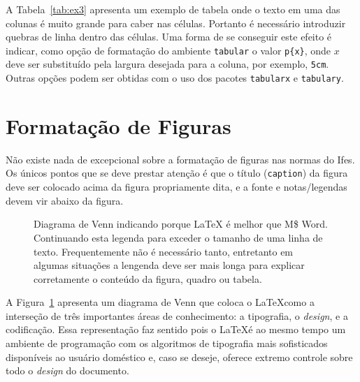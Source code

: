\documentclass[times,english,brazil,oneside,section=TITLE]{ifes8}
\begin{document}
A Tabela~\ref{tab:ex3} apresenta um exemplo de tabela onde o texto em
uma das colunas é muito grande para caber nas células. Portanto é
necessário introduzir quebras de linha dentro das células. Uma forma
de se conseguir este efeito é indicar, como opção de formatação do
ambiente \texttt{tabular} o valor \verb!p{x}!, onde $x$ deve ser
substituído pela largura desejada para a coluna, por exemplo,
\texttt{5cm}. Outras opções podem ser obtidas com o uso dos pacotes
\texttt{tabularx} e \texttt{tabulary}.



\section{Formatação de Figuras}
\label{sec:format-figuras}

Não existe nada de excepcional sobre a formatação de figuras nas
normas do Ifes. Os únicos pontos que se deve prestar atenção é que o
título (\texttt{caption}) da figura deve ser colocado acima da figura
propriamente dita, e a fonte e notas/legendas devem vir abaixo da
figura.

\begin{figure}[h]
  \centering
  \caption{Diagrama de Venn indicando porque \LaTeX{} é melhor que M\$ Word.
    Continuando esta legenda para exceder o tamanho de uma linha de texto.
    Frequentemente não é necessário tanto, entretanto em algumas situações a
    lengenda deve ser mais longa para explicar corretamente o conteúdo da
    figura, quadro ou tabela.}
  \label{fig:ex1}
\end{figure}

A Figura~\ref{fig:ex1} apresenta um diagrama de Venn que coloca o
\LaTeX como a interseção de três importantes áreas de conhecimento: a
tipografia, o \emph{design}, e a codificação. Essa representação faz
sentido pois o \LaTeX é ao mesmo tempo um ambiente de programação com
os algoritmos de tipografia mais sofisticados disponíveis ao usuário
doméstico e, caso se deseje, oferece extremo controle sobre todo o
\emph{design} do documento.
\end{document}
